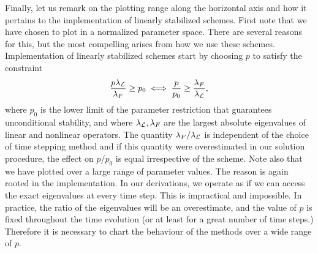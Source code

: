 Finally, let us remark on the plotting range along the horizontal axis and how it pertains to the implementation of linearly stabilized schemes. First note that we have chosen to plot in a normalized parameter space. There are several reasons for this, but the most compelling arises from how we use these schemes. Implementation of linearly stabilized schemes start by choosing $p$ to satisfy the constraint 
\begin{align}
      \frac{p\lambda_{\mathcal{L}}}{\lambda_F}  \geq p_0 
\iff  \frac{p}{p_0} \geq \frac{\lambda_F}{\lambda_{\mathcal{L}}},
\end{align}
where $p_0$ is the lower limit of the parameter restriction that guarantees unconditional stability, and where $\lambda_{\mathcal{L}}, \lambda_F$ are the largest absolute eigenvalues of linear and nonlinear operators. The quantity $\lambda_F/\lambda_{\mathcal{L}}$ is independent of the choice of time stepping method and if this quantity were overestimated in our solution procedure, the effect on $p/p_0$ is equal irrespective of the scheme. Note also that we have plotted over a large range of parameter values. The reason is again rooted in the implementation. In our derivations, we operate as if we can access the exact eigenvalues at every time step. This is impractical and impossible. In practice, the ratio of the eigenvalues will be an overestimate, and the value of $p$ is fixed throughout the time evolution (or at least for a great number of time steps.) Therefore it is necessary to chart the behaviour of the methods over a wide range of $p$.
